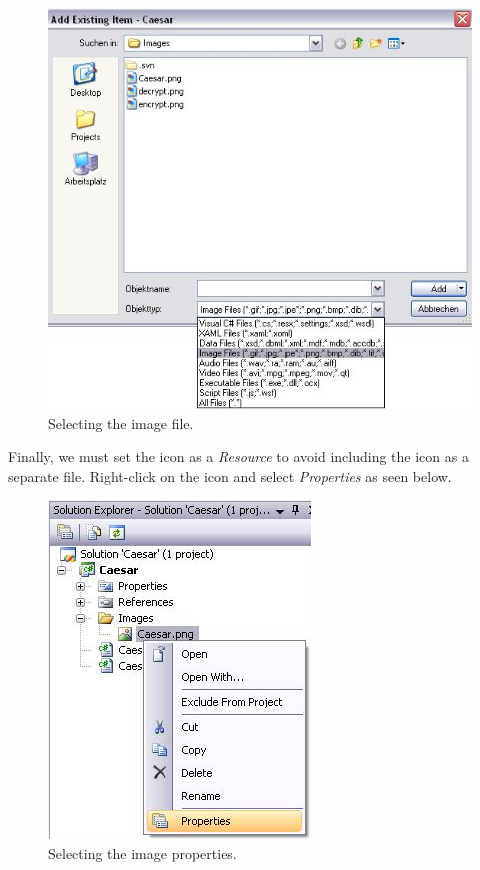 \begin{figure}[h!]
	\centering
		\includegraphics{figures/choose_icon.jpg}
	\caption{Selecting the image file.}
	\label{fig:choose_icon}
\end{figure}
\clearpage

Finally, we must set the icon as a \textit{Resource} to avoid including the icon as a separate file. Right-click on the icon and select \textit{Properties} as seen below.

\begin{figure}[h!]
	\centering
		\includegraphics{figures/icon_properties.jpg}
	\caption{Selecting the image properties.}
	\label{fig:icon_properties}
\end{figure}

